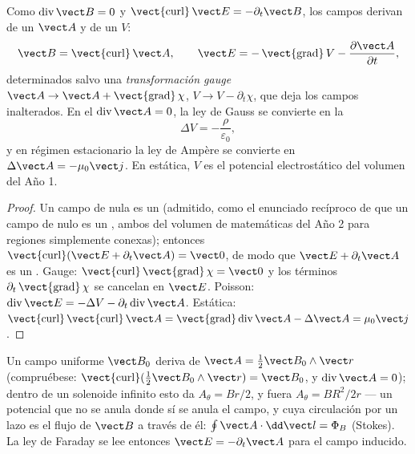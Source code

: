 \begin{proposition}\label{prop:b2:maxwell-equations:potentials}
Como $\operatorname{div}\vect B = 0$ y $\operatorname{\vect{curl}}\vect E = -\partial_t
\vect B$, los campos derivan de un \emph{} $\vect A$ y de un
\emph{} $V$:
\[
\vect B = \operatorname{\vect{curl}}\vect A , \qquad
\vect E = -\operatorname{\vect{grad}}V - \frac{\partial\vect A}{\partial t} ,
\]
determinados salvo una \emph{transformación gauge} $\vect A \to \vect A +
\operatorname{\vect{grad}}\chi$, $V \to V - \partial_t\chi$, que deja los campos
inalterados. En el \emph{} $\operatorname{div}\vect A = 0$, la
ley de Gauss se convierte en la \emph{}
\[
\Delta V = -\frac\rho{\varepsilon_0} ,
\]
y en régimen estacionario la ley de Ampère se convierte en $\Delta\vect A = -\mu_0\vect j$.
En estática, $V$ es el potencial electrostático del volumen del Año 1.
\end{proposition}

\begin{proof}
Un campo de  nula es un  (admitido, como el enunciado
recíproco de que un campo de  nulo es un , ambos del
volumen de matemáticas del Año 2 para regiones simplemente conexas);
entonces $\operatorname{\vect{curl}}
(\vect E + \partial_t\vect A) = \vect 0$, de modo que $\vect E + \partial_t\vect A$ es un .
Gauge: $\operatorname{\vect{curl}}\operatorname{\vect{grad}}\chi = \vect 0$ y los
términos $\partial_t\operatorname{\vect{grad}}\chi$ se cancelan en $\vect E$. Poisson: $\operatorname{div}
\vect E = -\Delta V - \partial_t\operatorname{div}\vect A$. Estática: $\operatorname{\vect{curl}}
\operatorname{\vect{curl}}\vect A = \operatorname{\vect{grad}}\operatorname{div}\vect A - \Delta\vect A
= \mu_0\vect j$.
\end{proof}

\begin{example}\label{ex:b2:maxwell-equations:vectorpot}
Un campo uniforme $\vect B_0$ deriva de $\vect A = \tfrac12\vect B_0\wedge\vect r$
(compruébese: $\operatorname{\vect{curl}}(\tfrac12\vect B_0\wedge\vect r) = \vect B_0$, y
$\operatorname{div}\vect A = 0$); dentro de un solenoide infinito esto da $A_\theta =
Br/2$, y fuera $A_\theta = BR^2/2r$ --- un potencial que no se anula donde sí
se anula el campo, y cuya circulación por un lazo es el flujo de $\vect B$ a
través de él: $\oint\vect A\cdot\dd\vect l = \Phi_B$ (Stokes). La ley de Faraday
se lee entonces $\vect E = -\partial_t\vect A$ para el campo inducido.
\end{example}

